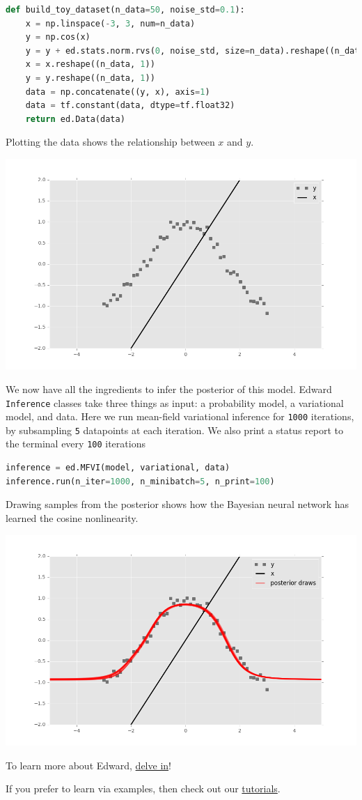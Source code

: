 \begin{lstlisting}[language=Python]
def build_toy_dataset(n_data=50, noise_std=0.1):
    x = np.linspace(-3, 3, num=n_data)
    y = np.cos(x) 
    y = y + ed.stats.norm.rvs(0, noise_std, size=n_data).reshape((n_data,))
    x = x.reshape((n_data, 1))
    y = y.reshape((n_data, 1))
    data = np.concatenate((y, x), axis=1)
    data = tf.constant(data, dtype=tf.float32)
    return ed.Data(data)  
\end{lstlisting}

Plotting the data shows the relationship between $x$ and $y$.

\includegraphics[width=700px]{images/getting-started-fig0.png}

We now have all the ingredients to infer the posterior of this model. 
Edward \texttt{Inference} classes take three things as input: a
probability model, a variational model, and data. Here we run mean-field
variational inference for \texttt{1000} iterations, by subsampling \texttt{5}
datapoints at each
iteration. We also print a status report to the terminal every \texttt{100}
iterations
\begin{lstlisting}[language=Python]
inference = ed.MFVI(model, variational, data)
inference.run(n_iter=1000, n_minibatch=5, n_print=100)  
\end{lstlisting}

Drawing samples from the posterior shows how the Bayesian neural network has
learned the cosine nonlinearity. 

\includegraphics[width=700px]{images/getting-started-fig2.png}

To learn more about Edward, \href{delving-in.html}{delve in}!

If you prefer to learn via examples, then check out our 
\href{tutorials.html}{tutorials}.
